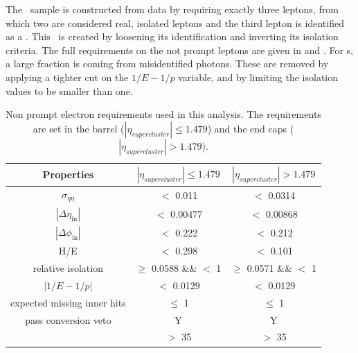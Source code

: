 The \NPL\ sample is constructed from data by requiring exactly three leptons, from which two are considered real, isolated leptons and the third lepton is identified as a \NPL. This \NPL\ is created by loosening its identification and inverting its isolation criteria. The full requirements on the not prompt leptons are given in   and . For \NPE s, a large fraction is coming from misidentified photons. These are removed by applying a tighter cut on the $1/E-1/p$ variable, and by limiting the isolation values to be smaller than one. 
\begin{table}[htbp]
	\centering
	
	\caption{Non prompt electron requirements used in this analysis. The requirements are set in the barrel ($|\eta_{supercluster}| \leq 1.479$)
		and the end caps ($|\eta_{supercluster}| > 1.479$). }
	\begin{tabular}{ccc}
		\toprule
	 Properties	& \multicolumn{1}{c|}{$|\eta_{supercluster}| \leq 1.479$ } & \multicolumn{1}{c}{$|\eta_{supercluster}| > 1.479$ } \\
		\midrule
		$\sigma_{\eta \eta}$ & $<$ 0.011 & $<$ 0.0314 \\ 
		
		$|\Delta\eta_{\mathrm{in}}|$ & $<$ 0.00477& $<$ 0.00868\\ 
		
		$|\Delta\phi_{\mathrm{in}}|$ & $<$ 0.222 &  $<$ 0.212 \\ 
		 
		H/E & $<$ 0.298& $<$ 0.101 \\ 
		
		relative isolation & $\geq$ 0.0588 \&\& $<$ 1 &  $\geq$ 0.0571 \&\& $<$ 1\\ 
	
		$|1/E-1/p|$ & $<$ 0.0129 \GeVinv & $<$ 0.0129 \GeVinv \\ 
		
		expected missing inner hits & $\leq $ 1 &  $\leq $ 1\\ 
	
		pass conversion veto & Y & Y \\ 
	
		\pt &$>$ 35 \GeV & $>$ 35 \GeV \\
		\bottomrule
	\end{tabular} 
	\label{tab:nonpromptel}
\end{table}

